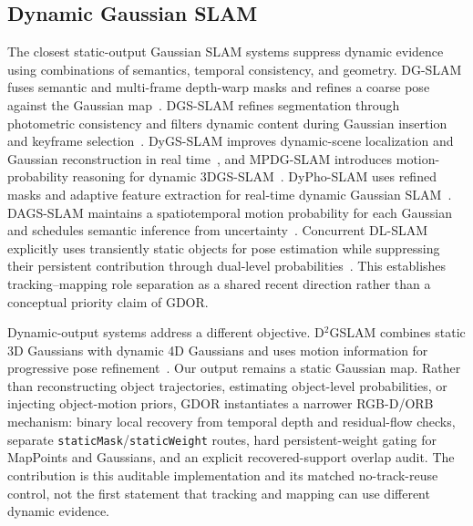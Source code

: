\subsection{Dynamic Gaussian SLAM}

The closest static-output Gaussian SLAM systems suppress dynamic evidence using combinations of semantics, temporal consistency, and geometry.
DG-SLAM fuses semantic and multi-frame depth-warp masks and refines a coarse pose against the Gaussian map~\cite{xu2024dgslam}.
DGS-SLAM refines segmentation through photometric consistency and filters dynamic content during Gaussian insertion and keyframe selection~\cite{kong2024dgsslam}.
DyGS-SLAM improves dynamic-scene localization and Gaussian reconstruction in real time~\cite{hu2025dygsslam}, and MPDG-SLAM introduces motion-probability reasoning for dynamic 3DGS-SLAM~\cite{huang2025mpdgslam}.
DyPho-SLAM uses refined masks and adaptive feature extraction for real-time dynamic Gaussian SLAM~\cite{liu2025dyphoslam}.
DAGS-SLAM maintains a spatiotemporal motion probability for each Gaussian and schedules semantic inference from uncertainty~\cite{zhang2026dagsslam}.
Concurrent DL-SLAM explicitly uses transiently static objects for pose estimation while suppressing their persistent contribution through dual-level probabilities~\cite{xu2026dlslam}.
This establishes tracking--mapping role separation as a shared recent direction rather than a conceptual priority claim of GDOR.

Dynamic-output systems address a different objective.
D$^2$GSLAM combines static 3D Gaussians with dynamic 4D Gaussians and uses motion information for progressive pose refinement~\cite{zhu2025d2gslam}.
Our output remains a static Gaussian map.
Rather than reconstructing object trajectories, estimating object-level probabilities, or injecting object-motion priors, GDOR instantiates a narrower RGB-D/ORB mechanism: binary local recovery from temporal depth and residual-flow checks, separate \texttt{staticMask}/\texttt{staticWeight} routes, hard persistent-weight gating for MapPoints and Gaussians, and an explicit recovered-support overlap audit.
The contribution is this auditable implementation and its matched no-track-reuse control, not the first statement that tracking and mapping can use different dynamic evidence.
